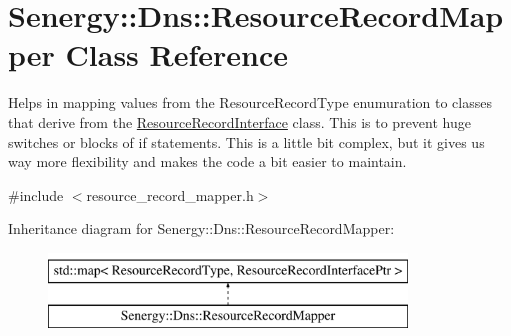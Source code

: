\hypertarget{class_senergy_1_1_dns_1_1_resource_record_mapper}{\section{Senergy\-:\-:Dns\-:\-:Resource\-Record\-Mapper Class Reference}
\label{class_senergy_1_1_dns_1_1_resource_record_mapper}
}


Helps in mapping values from the Resource\-Record\-Type enumuration to classes that derive from the \hyperlink{class_senergy_1_1_dns_1_1_resource_record_interface}{Resource\-Record\-Interface} class. This is to prevent huge switches or blocks of if statements. This is a little bit complex, but it gives us way more flexibility and makes the code a bit easier to maintain.  




{\ttfamily \#include $<$resource\-\_\-record\-\_\-mapper.\-h$>$}

Inheritance diagram for Senergy\-:\-:Dns\-:\-:Resource\-Record\-Mapper\-:\begin{figure}[H]
\begin{center}
\leavevmode
\includegraphics[height=2.000000cm]{class_senergy_1_1_dns_1_1_resource_record_mapper}
\end{center}
\end{figure}
